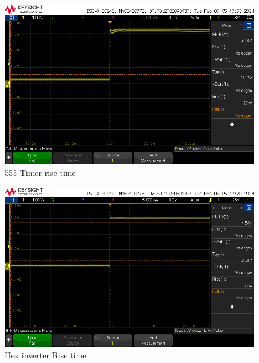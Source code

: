\documentclass[a4paper,11pt]{article}%
\begin{document}
\begin{figure}[H]
	\centering
	\includegraphics[scale=0.6]{figures/rise_555.png}
	\caption{555 Timer rise time}
	\label{rise555}
\end{figure}

\begin{figure}[H]
	\centering
	\includegraphics[scale=0.6]{figures/rise_hex.png}
	\caption{Hex inverter Rise time}
	\label{risehex}
\end{figure}


 


\end{document}
